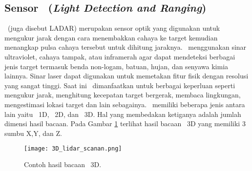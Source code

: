     \subsection{Sensor \lidar\ (\textit{Light Detection and Ranging})}
    \label{subsec:lidar_sensor}
    
    \lidar\ (juga disebut LADAR) merupakan sensor optik yang digunakan untuk mengukur jarak dengan cara menembakkan cahaya ke target kemudian menangkap pulsa cahaya tersebut untuk dihitung jaraknya.  \lidar\ menggunakan sinar ultraviolet, cahaya tampak, atau inframerah agar dapat mendeteksi berbagai jenis target termasuk benda non-logam, batuan, hujan, dan senyawa kimia lainnya. Sinar laser dapat digunakan untuk memetakan fitur fisik dengan resolusi yang sangat tinggi. Saat ini \lidar\ dimanfaatkan untuk berbagai keperluan seperti mengukur jarak, menghitung kecepatan target bergerak, membaca lingkungan, mengestimasi lokasi target dan lain sebagainya. \lidar\ memiliki beberapa jenis antara lain yaitu \lidar\ 1D, \lidar\ 2D, dan \lidar\ 3D. Hal yang membedakan ketiganya adalah jumlah dimensi hasil bacaan. Pada Gambar \ref{fig:Ch02_3d_bacaan} terlihat hasil bacaan \lidar\ 3D yang memiliki 3 sumbu X,Y, dan Z.
    \begin{figure}[H]
        \centering
        \texttt{[image: 3D\_lidar\_scanan.png]}
        \caption{Contoh hasil bacaan \lidar\ 3D\cite{bs7}.}
        \label{fig:Ch02_3d_bacaan}
    \end{figure}

    

